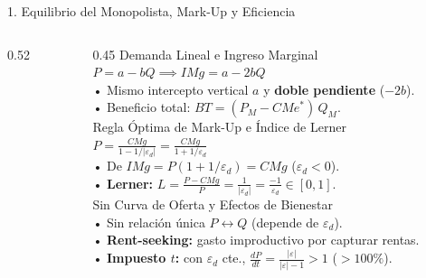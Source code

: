 \documentclass[aspectratio=169, 10pt]{beamer}
\begin{document}
\begin{frame}{1. Equilibrio del Monopolista, Mark-Up y Eficiencia}
\begin{columns}[T]
\begin{column}{0.52\textwidth}
    \end{column}

    \begin{column}{0.45\textwidth}
      {\scriptsize\color{grisTexto}Demanda Lineal e Ingreso Marginal}\\[1pt]
      {\small\color{azulPrincipal}\textbf{\(P = a - bQ \implies IMg = a - 2bQ\)}}\\[1pt]
      {\scriptsize
        • Mismo intercepto vertical \(a\) y \textbf{doble pendiente} (\(-2b\)).\\
        • Beneficio total: \(BT = (P_M - CMe^*)\,Q_M\).\\[3pt]
      }
      {\scriptsize\color{grisTexto}Regla Óptima de Mark-Up e Índice de Lerner}\\[1pt]
      {\small\color{naranjaAcento}\textbf{\(P = \frac{CMg}{1 - 1/|\varepsilon_d|} = \frac{CMg}{1 + 1/\varepsilon_d}\)}}\\[1pt]
      {\scriptsize
        • De \(IMg = P(1 + 1/\varepsilon_d) = CMg\) (\(\varepsilon_d < 0\)).\\
        • \textbf{Lerner:} \(L = \frac{P-CMg}{P} = \frac{1}{|\varepsilon_d|} = \frac{-1}{\varepsilon_d} \in [0, 1]\).\\[3pt]
      }
      {\scriptsize\color{grisTexto}Sin Curva de Oferta y Efectos de Bienestar}\\[1pt]
      {\scriptsize
        • Sin relación única \(P \leftrightarrow Q\) (depende de \(\varepsilon_d\)).\\
        • \textbf{Rent-seeking:} gasto improductivo por capturar rentas.\\
        • \textbf{Impuesto \(t\):} con \(\varepsilon_d\) cte., \(\frac{dP}{dt} = \frac{|\varepsilon|}{|\varepsilon|-1} > 1\) (\(>100\%\)).
      }
    \end{column}
  \end{columns}

\end{frame}
\end{document}
